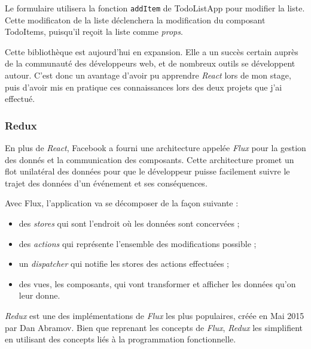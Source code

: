 \documentclass[12pt,a4paper]{article}
\providecommand{\tightlist}{%
  \setlength{\itemsep}{0pt}\setlength{\parskip}{0pt}}
\begin{document}
  Le formulaire utilisera la fonction \texttt{addItem} de TodoListApp pour
  modifier la liste. Cette modificaton de la liste déclenchera la
  modification du composant TodoItems, puisqu'il reçoit la liste comme
  \emph{props}.

  \bigskip

  Cette bibliothèque est aujourd'hui en expansion. Elle a un succès
  certain auprès de la communauté des développeurs web, et de nombreux
  outils se développent autour. C'est donc un avantage d'avoir pu
  apprendre \emph{React} lors de mon stage, puis d'avoir mis en pratique
  ces connaissances lors des deux projets que j'ai effectué.

  \bigskip

  \subsubsection{Redux}\label{redux}

  \bigskip

  En plus de \emph{React}, Facebook a fourni une architecture appelée
  \emph{Flux} pour la gestion des donnés et la communication des
  composants. Cette architecture promet un flot unilatéral des données
  pour que le développeur puisse facilement suivre le trajet des données
  d'un événement et ses conséquences.

  \bigskip

  Avec Flux, l'application va se décomposer de la façon suivante :

  \begin{itemize}
  \tightlist
  \item
    des \emph{stores} qui sont l'endroit où les données sont concervées ;
  \item
    des \emph{actions} qui représente l'ensemble des modifications
    possible ;
  \item
    un \emph{dispatcher} qui notifie les stores des actions effectuées ;
  \item
    des vues, les composants, qui vont transformer et afficher les données
    qu'on leur donne.
  \end{itemize}

  \bigskip

  \emph{Redux} est une des implémentations de \emph{Flux} les plus
  populaires, créée en Mai 2015 par Dan Abramov. Bien que reprenant les
  concepts de \emph{Flux}, \emph{Redux} les simplifient en utilisant des
  concepts liés à la programmation fonctionnelle.
\end{document}
